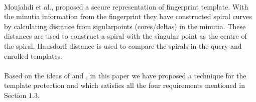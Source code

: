 \documentclass[14pt, oneside]{article}   	%
\begin{document}
\paragraph{}
Moujahdi et al.\cite{4}, proposed a secure representation of fingerprint template. With the minutia information from the fingerprint they have constructed spiral curves by calculating distance from sigularpoints (cores/deltas) in the minutia. These distances are used to construct a spiral with the singular point as the centre of the spiral. Hausdorff distance is used to compare the spirals in the query and enrolled templates. 
\paragraph{}
Based on the ideas of \cite{12} and \cite{4}, in this paper we have proposed a technique for the template protection and which satisfies all the four requirements mentioned in Section $1.3$. 
\end{document}
